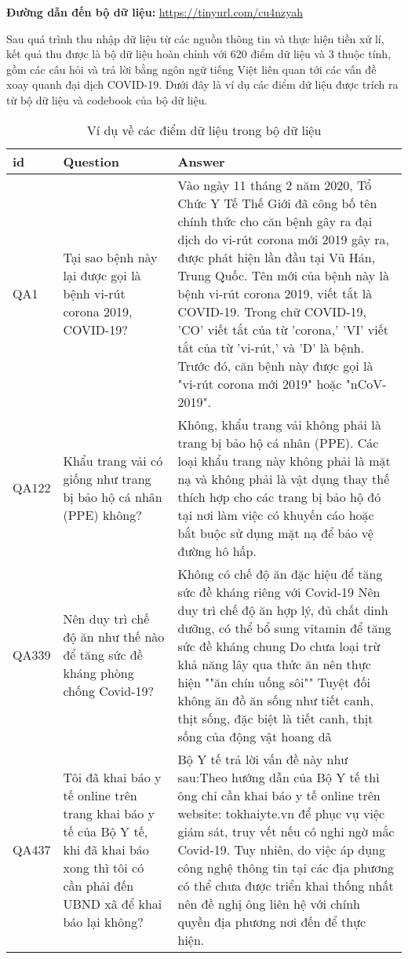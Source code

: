 \documentclass[runningheads]{llncs}
\begin{document}
\textbf{Đường dẫn đến bộ dữ liệu:} \url{https://tinyurl.com/cu4nzyah}

Sau quá trình thu nhập dữ liệu từ các nguồn thông tin và thực hiện tiền xử lí, kết quả thu được là bộ dữ liệu hoàn chỉnh với 620 điểm dữ liệu và 3 thuộc tính, gồm các câu hỏi và trả lời bằng ngôn ngữ tiếng Việt liên quan tới các vấn đề xoay quanh đại dịch COVID-19. Dưới đây là ví dụ các điểm dữ liệu được trích ra từ bộ dữ liệu và codebook của bộ dữ liệu.

\begin{table}
	\setlength{\tabcolsep}{0.5em}
	\renewcommand{\arraystretch}{1.4}
	\begin{center}
	\caption{Ví dụ về các điểm dữ liệu trong bộ dữ liệu}\label{tab4}
		\begin{tabular}{ | p{1.25cm} | p{5cm} | p{5cm} |} 
			\hline
    		\textbf{id} & \textbf{Question} & \textbf{Answer}\\ 
			\hline
			QA1 & Tại sao bệnh này lại được gọi là bệnh vi-rút corona 2019, COVID-19?&Vào ngày 11 tháng 2 năm 2020, Tổ Chức Y Tế Thế Giới đã công bố tên chính thức cho căn bệnh gây ra đại dịch do vi-rút corona mới 2019 gây ra, được phát hiện lần đầu tại Vũ Hán, Trung Quốc. Tên mới của bệnh này là bệnh vi-rút corona 2019, viết tắt là COVID-19. Trong chữ COVID-19, 'CO' viết tắt của từ 'corona,' 'VI' viết tắt của từ 'vi-rút,' và 'D' là bệnh. Trước đó, căn bệnh này được gọi là "vi-rút corona mới 2019" hoặc "nCoV-2019".
			\\ 
			\hline
			QA122&Khẩu trang vải có giống như trang bị bảo hộ cá nhân (PPE) không?&Không, khẩu trang vải không phải là trang bị bảo hộ cá nhân (PPE). Các loại khẩu trang này không phải là mặt nạ và không phải là vật dụng thay thế thích hợp cho các trang bị bảo hộ đó tại nơi làm việc có khuyến cáo hoặc bắt buộc sử dụng mặt nạ để bảo vệ đường hô hấp.
			\\
			\hline
			QA339&Nên duy trì chế độ ăn như thế nào để tăng sức đề kháng phòng chống Covid-19?&Không có chế độ ăn đặc hiệu để tăng sức đề kháng riêng với Covid-19  
			Nên duy trì chế độ ăn hợp lý, đủ chất dinh dưỡng, có thể bổ sung vitamin để tăng sức đề kháng chung Do chưa loại trừ khả năng lây qua thức ăn nên thực hiện ""ăn chín uống sôi"" Tuyệt đối không ăn đồ ăn sống như tiết canh, thịt sống, đặc biệt là tiết canh, thịt sống của động vật hoang dã\\
			\hline
			QA437&Tôi đã khai báo y tế online trên trang khai báo y tế của Bộ Y tế, khi đã khai báo xong thì tôi có cần phải đến UBND xã để khai báo lại không?&Bộ Y tế trả lời vấn đề này như sau:Theo hướng dẫn của Bộ Y tế thì ông chỉ cần khai báo y tế online trên website: tokhaiyte.vn để phục vụ việc giám sát, truy vết nếu có nghi ngờ mắc Covid-19. Tuy nhiên, do việc áp dụng công nghệ thông tin tại các địa phương có thể chưa được triển khai thống nhất nên đề nghị ông liên hệ với chính quyền địa phương nơi đến để thực hiện.\\

\end{tabular}
\end{center}
\end{table}
\end{document}
